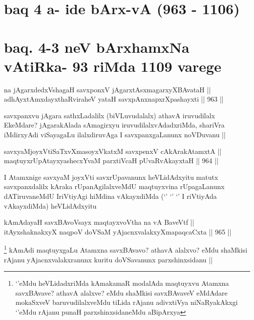\section*{baq 4 a- ide bArx-vA (963 - 1106)}

\section*{baq. 4-3 neV bArxhamxNa vAtiRka- 93 riMda 1109 varege}


\begin{shl}
na jAgarxdedxVshagaH savxponxV jAgarxtAsxmagarxyXBAvataH || \\
adhAyxtAmxdayxthaRviraheV yataH savxpAnxnapxrXpashayxti ||  963 ||  
\end{shl}

\begin{artha}
savxpanxvu jAgara sathxLadalilx (biVLuvudalalx) athavA iruvudilalx EkeMdare? jAgarakAlada sAmagirxyu iruvudilalxvAdadxriMda, shariVra iMdirxyAdi viSayagaLu ilalxdiruvAga I savxpanxgaLanunx noVDuvanu ||
\end{artha}


\begin{shl}
savxyaMjoyxVtiSaTxvXmasoyxVkatxM savxpenxV cAkArakAtamxtA || \\
maqtuyxrUpAtayxyashecxYvaM parxtiVcaH pUvaRvAkayxtaH ||  964 ||  
\end{shl}

\begin{artha}
I Atamxnige savxyaM joyxVti savxrUpavanunx heVLidAdxyitu matutx savxpanxdalilx kAraka rUpanAgilalxveMdU maqtuyxvina rUpagaLanunx dATiruvaneMdU IriVtiyAgi hiMdina vAkayxdiMda (`\stext' `\stext' `\stext' I riVtiyAda vAkayxdiMda) heVLidAdxyitu
\end{artha}


\begin{shl}
kAmAdayaH savxBAvoV\s sayx maqtayxvoV\s tha na vA BaveVtf || \\
itAyxshaknakxyX naqpoV doVSaM yAjacnxvalakxyXmapaqcaCxta ||  965 ||  
\end{shl}

\begin{artha}
\footnote{`\stext'eMdu heVLidadxriMda kAmakamaR modalAda maqtuyxvu Atamxna savxBAvave? athavA alalxve? eMdu shaMkisi savxBAvaveV eMdAdare mokaSxveV baruvudilalxveMdu tiLida rAjanu adivxtiVya niNaRyakAkxgi `\stext'eMdu rAjanu punaH parxshinxsidaneMdu aBipArxya}
kAmAdi maqtuyxgaLu Atamxna savxBAvavo? athavA alalxvo? eMdu shaMkisi rAjanu yAjacnxvalakxranunx kuritu doVSavanunx parxshinxsidanu ||
\end{artha}

